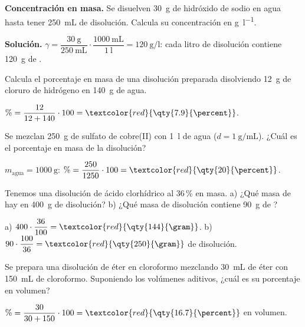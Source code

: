 \begin{example}
    \textbf{Concentración en masa.} Se disuelven \qty{30}{\gram} de hidróxido de sodio en agua hasta tener \qty{250}{\mL} de
    disolución. Calcula su concentración en \unit{\gram\per\litre}.

    \textbf{Solución.} \(\gamma = \dfrac{\qty{30}{\gram}}{\qty{250}{\mL}} \cdot \dfrac{\qty{1000}{\mL}}{\qty{1}{\litre}} =
    \qty{120}{\gram\per\litre}\): cada litro de disolución contiene \qty{120}{\gram} de .
\end{example}

\begin{exercise}
    Calcula el porcentaje en masa de una disolución preparada disolviendo \qty{12}{\gram} de cloruro de hidrógeno en
    \qty{140}{\gram} de agua.
    \begin{solu}
        \(\% = \dfrac{12}{12 + 140} \cdot 100 = \textcolor{red}{\qty{7.9}{\percent}}\).
    \end{solu}
\end{exercise}

\begin{exercise}
    Se mezclan \qty{250}{\gram} de sulfato de cobre(II) con \qty{1}{\litre} de agua (\(d = \qty{1}{\gram\per\mL}\)). ¿Cuál es el
    porcentaje en masa de la disolución?
    \begin{solu}
        \(m_{\text{agua}} = \qty{1000}{\gram}\): \(\% = \dfrac{250}{1250} \cdot 100 = \textcolor{red}{\qty{20}{\percent}}\).
    \end{solu}
\end{exercise}

\begin{exercise}
    Tenemos una disolución de ácido clorhídrico al 36\,\% en masa. a) ¿Qué masa de  hay en \qty{400}{\gram} de disolución?
    b) ¿Qué masa de disolución contiene \qty{90}{\gram} de ?
    \begin{solu}
        a) \(400 \cdot \dfrac{36}{100} = \textcolor{red}{\qty{144}{\gram}}\). b) \(90 \cdot \dfrac{100}{36} = \textcolor{red}{\qty{250}{\gram}}\) de disolución.
    \end{solu}
\end{exercise}

\begin{exercise}
    Se prepara una disolución de éter en cloroformo mezclando \qty{30}{\mL} de éter con \qty{150}{\mL} de cloroformo. Suponiendo
    los volúmenes aditivos, ¿cuál es su porcentaje en volumen?
    \begin{solu}
        \(\% = \dfrac{30}{30 + 150} \cdot 100 = \textcolor{red}{\qty{16.7}{\percent}}\) en volumen.
    \end{solu}
\end{exercise}

